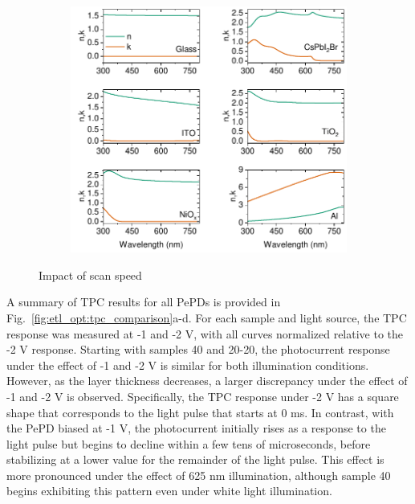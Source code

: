 \begin{figure}[t]
\begin{subfigure}[t]{0.4\textwidth}
        \caption{}
        \label{}
    \end{subfigure}
    \caption{}
    \label{fig:etl_opt:tpc_sources_and_simulation}
\end{figure}



\begin{figure}[htbp]
    \centering
    \begin{subfigure}[t]{0.7\textwidth}
        \centering
        \includegraphics[width=\textwidth]{chapters/transport_layers/images/nk_transfer_matrix.pdf} %
                
    \end{subfigure}
    \caption{Impact of scan speed}
    \label{fig:tetl_opt:nk_transfer_materix}
\end{figure}


A summary of TPC results for all PePDs is provided in Fig.~\ref{fig:etl_opt:tpc_comparison}a-d. For each sample and light source, the TPC response was measured at -1 and -2 V, with all curves normalized relative to the -2 V response. Starting with samples 40 and 20-20, the photocurrent response under the effect of -1 and -2 V is similar for both illumination conditions. However, as the  layer thickness decreases, a larger discrepancy under the effect of -1 and -2 V is observed. Specifically, the TPC response under -2 V has a square shape that corresponds to the light pulse that starts at 0 ms. In contrast, with the PePD biased at -1 V, the photocurrent initially rises as a response to the light pulse but begins to decline within a few tens of microseconds, before stabilizing at a lower value for the remainder of the light pulse. This effect is more pronounced under the effect of 625 nm illumination, although sample 40 begins exhibiting this pattern even under white light illumination.


